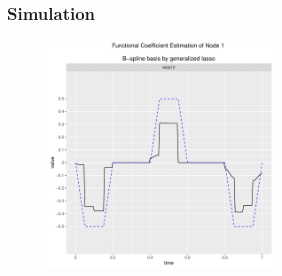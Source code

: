 \documentclass{beamer}
\begin{document}
\begin{frame}
	\frametitle{Simulation}
	\begin{figure}
		\includegraphics[height = 6cm]{2dexample_genlasso.pdf}
	\end{figure}
\end{frame}

\end{document}
